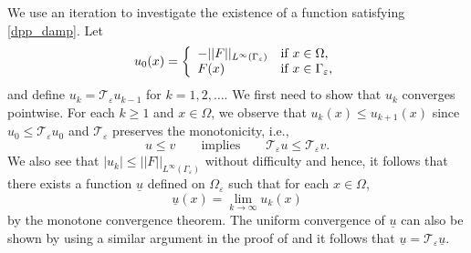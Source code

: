 \documentclass[english]{amsart}
\newcommand{\eps}{\varepsilon}
\theoremstyle{plain}
\theoremstyle{definition}
\theoremstyle{remark}
\numberwithin{equation}{section}
\begin{document}
We use an iteration to investigate the existence of a function satisfying \eqref{dpp_damp}.
Let 
\begin{align*} u_0(x) =
 \left\{ \begin{array}{ll}
-||F||_{L^{\infty}(\Gamma_{\eps})} & \textrm{if $ x\in \Omega$,}\\
 F(x)& \textrm{if $ x\in \Gamma_{\eps}$,}\\
\end{array} \right.
\end{align*} and define $u_{k}=\mathcal{T}_{\eps}u_{k-1}$
for $k=1,2,\dots$.
We first need to show that $u_k$ converges pointwise.
For each $k\ge1$ and $x\in \Omega$, we observe that
$u_{k}(x)\le u_{k+1}(x)$ since $u_0 \le \mathcal{T}_{\eps}u_0$ and $\mathcal{T}_{\eps}$ preserves the monotonicity, i.e.,
$$ u\le v \qquad \textrm{implies} \qquad \mathcal{T}_{\eps}u\le \mathcal{T}_{\eps}v.$$
We also see that $|u_k|\le ||F||_{L^{\infty}(\Gamma_{\eps})}$ without difficulty and hence,
it follows that there exists a function $\underline{u}$ defined on $\Omega_{\eps}$ such that for each $x\in\Omega$,
$$\underline{u}(x)=\lim_{k\to \infty}u_k (x) $$
by the monotone convergence theorem. 
The uniform convergence of $\underline{u}$ can also be shown by using a similar argument in the proof of \cite[Theorem 2.1]{MR3161602}
and it follows that $\underline{u}=\mathcal{T}_{\eps}\underline{u}$.
\end{document}
